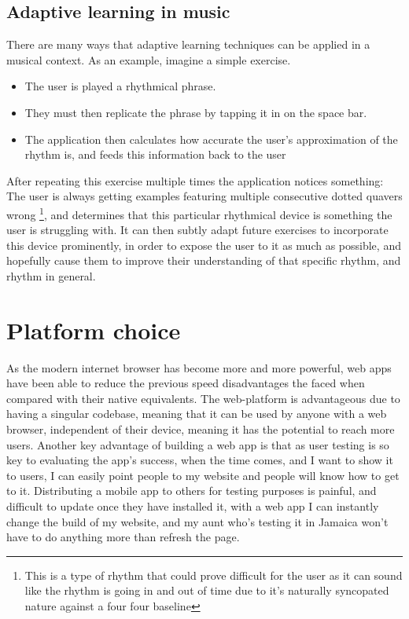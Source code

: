 	
	\subsection{Adaptive learning in music}
		There are many ways that adaptive learning techniques can be applied in a musical context. As an example, imagine a simple exercise.
		\begin{itemize}
			\item The user is played a rhythmical phrase.
			\item They must then replicate the phrase by tapping it in on the space bar. 
			\item The application then calculates how accurate the user's approximation of the rhythm is, and feeds this information back to the user
		\end{itemize}
		After repeating this exercise multiple times the application notices something: The user is always getting examples featuring multiple consecutive dotted quavers wrong		\footnote{This is a type of rhythm that could prove difficult for the user as it can sound like the rhythm is going in and out of time due to it's naturally syncopated nature 		against a four four baseline}, and determines that this particular rhythmical device is something the user is struggling with. It can then subtly adapt future exercises to 	incorporate this device prominently, in order to expose the user to it as much as possible, and hopefully cause them to improve their understanding of that specific rhythm, and rhythm in general.
	\section{Platform choice}
	As the modern internet browser has become more and more powerful, web apps have been able to reduce the previous speed disadvantages the faced when compared with their native equivalents. The web-platform is advantageous due to having a singular codebase, meaning that it can be used by anyone with a web browser, independent of their device, meaning it has the potential to reach more users. Another key advantage of building a web app is that as user testing is so key to evaluating the app's success, when the time comes, and I want to show it to users, I can easily point people to my website and people will know how to get to it. Distributing a mobile app to others for testing purposes is painful, and difficult to update once they have installed it, with a web app I can instantly change the build of my website, and my aunt who's testing it in Jamaica won't have to do anything more than refresh the page.
